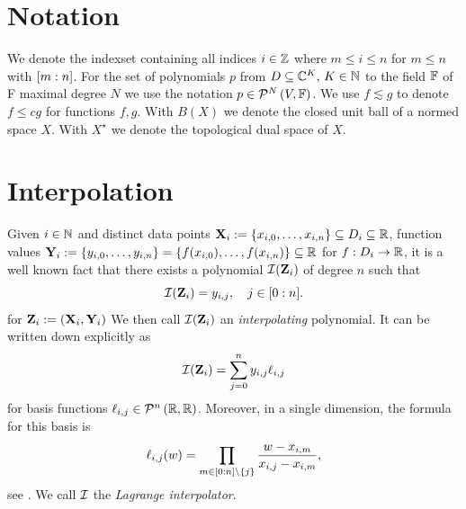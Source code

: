 \documentclass[12pt, oneside]{amsart}
\theoremstyle{definition}
\theoremstyle{remark}
\numberwithin{equation}{section}
\begin{document}
\section{Notation}

We denote the indexset containing all indices $i\in \Z$ 
where $m\leq i\leq n$ for $m\leq n$ with \(\indexset[m]{n}\). For the set of 
polynomials \(p\) from \(D \subseteq \C^K,\, K \in \N\) to the field \(\F\) of F
maximal 
degree \(N\) we use the notation 
\(p \in \pols[N]{V, \F}\).
We use \(f \lesssim g\) to denote \(f \leq c 
g\) for functions \(f, g\). With \(B(X)\) we denote the closed unit ball of a 
normed space \(X\). With \(X^\star\) we denote the topological dual space of 
\(X\).

\newpage

\section{Interpolation}

Given \(i \in \N\) and distinct data points \(\XX_i \defn \set{x_{i, 0}, \dots, 
	x_{i, n}} \subseteq D_i \subseteq \R\), function values 
\(\YY_i \defn \set{y_{i, 0}, \dots, y_{i, n}} = \set{f(x_{i, 0}), \dots, 
	f(x_{i, n})} \subseteq \R\) for \(f: D_i \to \R\), it is a well known fact 
	that 
there exists a polynomial \(\cI(\ZZ_i)\) of degree \(n\) such that \[
\cI(\ZZ_i) = y_{i, j},\quad j \in \indexset[0]{n}.
\]
for \(\ZZ_i \defn (\XX_i, \YY_i)\)
We then call \(\cI(\ZZ_i)\) an \emph{interpolating} polynomial. It can be 
written down explicitly as \begin{equation}\label{interpolating_polynomial}
	\cI(\ZZ_i) = \sum_{j=0}^n y_{i, j} \ell_{i, j}
\end{equation}
for basis functions \(\ell_{i, j} \in \pols[n]{\R, \R}\). Moreover, in a single 
dimension, the formula for this basis is
\[
\ell_{i, j}(w) = \prod_{m \in \indexset[0]{n} \setminus \set{j}} 
\frac{w-x_{i, m}}{x_{i, j}-x_{i, m}},
\]
see \cite{waring1779, lagrange1901}. We call \(\cI\) the 
\emph{Lagrange interpolator}.
\end{document}
